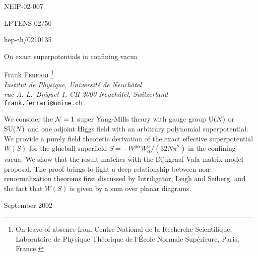 \documentclass[a4paper,12pt]{article}
\def\suN{{\rm SU}(N)}
\def\uN{{\rm U}(N)}
\begin{document}
%
\def\L{\Lambda}
%
\pagestyle{empty}
%
{\parskip 0in

\hfill NEIP-02-007

\hfill LPTENS-02/50

\hfill hep-th/0210135}

\vfill
%
\begin{center}
{\LARGE On exact superpotentials in confining vacua}



\vspace{0.4in}

Frank F{\scshape errari}{\renewcommand{\thefootnote}{$\!\!\dagger$}
\footnote{On leave of absence from Centre 
National de la Recherche Scientifique, Laboratoire de Physique 
Th\'eorique de l'\'Ecole Normale Sup\'erieure, Paris, France.}}
\\
\medskip
{\it Institut de Physique, Universit\'e de Neuch\^atel\\
rue A.-L.~Br\'eguet 1, CH-2000 Neuch\^atel, Switzerland}\\
\smallskip
{\tt frank.ferrari@unine.ch}
\end{center}
%
\vfill\noindent
We consider the ${\cal N}=1$ super Yang-Mills theory with gauge group
$\uN$ or $\suN$ and one adjoint Higgs field with an arbitrary
polynomial superpotential.
We provide a purely field theoretic derivation of the
exact effective superpotential $W(S)$ for the glueball superfield
$S=-W^{a\alpha}W^{a}_{\alpha}/(32 N\pi^{2})$ in the confining vacua.
We show that the result matches with the Dijkgraaf-Vafa matrix model
proposal. The proof brings to light a deep relationship between
non-renormalization theorems first discussed by Intriligator, Leigh
and Seiberg, and the fact that $W(S)$ is given by a sum over planar
diagrams.

\vfill

\medskip
%
\begin{flushleft}
September 2002
\end{flushleft}
%
\newpage\pagestyle{plain}
\baselineskip 16pt
\setcounter{footnote}{0}
\end{document}
